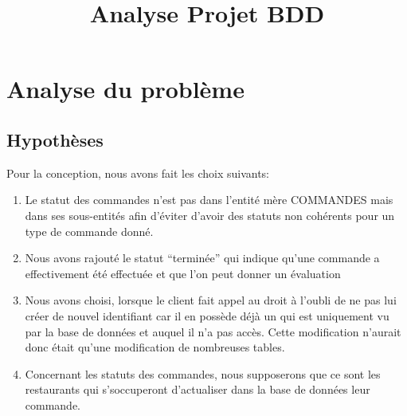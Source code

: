 \documentclass[10pt, a4paper]{article}
\title{Analyse Projet BDD}
\date{}
\begin{document}
\maketitle
\tableofcontents
\newpage

\section{Analyse du problème}
\subsection{Hypothèses}
Pour la conception, nous avons fait les choix suivants:
\begin{enumerate}
    \item Le statut des commandes n'est pas dans l'entité mère COMMANDES 
mais dans ses sous-entités afin d'éviter d'avoir des statuts non cohérents 
pour un type de commande donné.
    \item Nous avons rajouté le statut ``terminée'' qui indique qu'une 
commande a effectivement été effectuée et que l'on peut donner un 
évaluation
    \item Nous avons choisi, lorsque le client fait appel au droit à l'oubli de ne pas lui créer de nouvel identifiant car il en possède déjà
    un qui est uniquement vu par la base de données et auquel il n'a pas accès. Cette modification n'aurait donc était qu'une modification de nombreuses tables.
    \item Concernant les statuts des commandes, nous supposerons que ce sont les restaurants qui s'soccuperont d'actualiser dans la base de données leur commande.
\end{enumerate}
\end{document}
